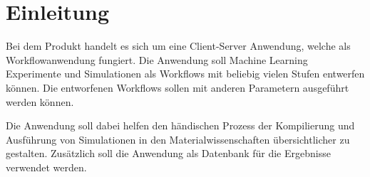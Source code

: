 \chapter{Einleitung}
Bei dem Produkt handelt es sich um eine \gls{Client-Server}  Anwendung, welche als Workflowanwendung fungiert. Die Anwendung soll \gls{Machine Learning} Experimente und Simulationen als Workflows mit beliebig vielen Stufen entwerfen können. Die entworfenen Workflows sollen mit anderen Parametern ausgeführt werden können.

Die Anwendung soll dabei helfen den händischen Prozess der Kompilierung und Ausführung von Simulationen in den Materialwissenschaften übersichtlicher zu gestalten. Zusätzlich soll die Anwendung als Datenbank für die Ergebnisse verwendet werden.

